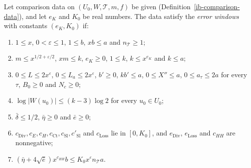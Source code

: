 \begin{definition}\label{ib-error-windows}
Let comparison data on $(U_0,W,\mathcal T,m,f)$ be given
(Definition~\ref{ib-comparison-data}), and let $e_K$ and $K_0$ be real numbers.
The data satisfy the \emph{error windows} with constants $(e_K,K_0)$ if:
\begin{enumerate}
\item $1\leq x$, $0<\varepsilon\leq1$, $1\leq b$, $xb\leq a$ and
  $n_{\mathcal T}\geq1$;
\item $m\leq x^{1/2+\varepsilon/2}$, $xm\leq k$, $e_K\geq0$, $1\leq k$,
  $k\leq x^{e_K}$ and $k\leq a$;
\item $0\leq L\leq2x^\varepsilon$, $0\leq L_a\leq2x^\varepsilon$, $b'\geq0$,
  $kb'\leq a$, $0\leq X''\leq a$, $0\leq a_\tau\leq2a$ for every $\tau$,
  $B_0\geq0$ and $N_c\geq0$;
\item $\log|W(u_0)|\leq(k-3)\log2$ for every $u_0\in U_0$;
\item $\bar\delta\leq1/2$, $\bar\eta\geq0$ and $\bar e\geq0$;
\item $c_{\mathrm{Div}},c_E,c_H,c_{\mathrm{Ct}},c_{\mathrm{Sl}},c'_{\mathrm{Sl}}$
  and $c_{\mathrm{Loss}}$ lie in $[0,K_0]$, and $e_{\mathrm{Div}}$,
  $e_{\mathrm{Loss}}$ and $c_{HH}$ are nonnegative;
\item $(\bar\eta+4\sqrt{\bar e})x^{c_{HH}}b\leq K_0x^\varepsilon n_{\mathcal T}a$.
\end{enumerate}
\end{definition}

